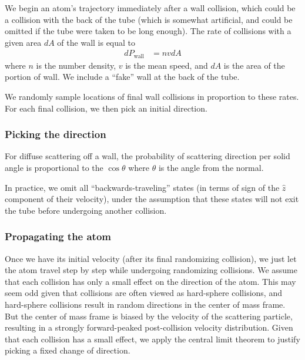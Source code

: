 \documentclass{article}
\begin{document}
We begin an atom's trajectory immediately after a wall collision, which could be a collision with the back of
the tube (which is somewhat artificial, and could be omitted if the
tube were taken to be long enough).  The rate of collisions with a given area $dA$ of the
wall is equal to
\begin{align}
  dP_{\text{wall}} &= nvdA
\end{align}
where $n$ is the number density, $v$ is the mean speed, and $dA$ is
the area of the portion of wall.  We include a ``fake'' wall at the
back of the tube.

We randomly sample locations of final wall collisions in proportion to these rates.  For
each final collision, we then pick an initial direction.

\subsubsection{Picking the direction}
For diffuse scattering off a wall, the probability
of scattering direction per solid angle is proportional to the
$\cos\theta$ where $\theta$ is the angle from the normal.

In practice, we omit all ``backwards-traveling'' states (in terms of sign of the $\hat z$ component of their velocity),
under the assumption that these states will not exit the tube before
undergoing another collision.

\subsubsection{Propagating the atom}
Once we have its initial velocity (after its final randomizing
collision), we just let the atom travel step by step while undergoing
randomizing collisions.  We assume that each collision has only a small effect on the direction of the atom.  This may seem odd given that collisions are often viewed as hard-sphere collisions, and hard-sphere collisions result in random directions in the center of mass frame.  But the center of mass frame is biased by the velocity of the scattering particle, resulting in a strongly forward-peaked post-collision velocity distribution.  Given that each collision has a small effect, we apply the central limit theorem to justify picking a fixed change of direction.
\end{document}
